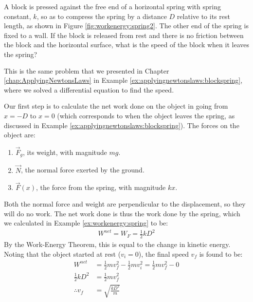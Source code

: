\begin{example}{A block is pressed against the free end of a horizontal spring with spring constant, $k$, so as to compress the spring by a distance $D$ relative to its rest length, as shown in Figure \ref{fig:workenergy:spring2}. The other end of the spring is fixed to a wall. 
If the block is released from rest and there is no friction between the block and the horizontal surface, what is the speed of the block when it leaves the spring?
}

This is the same problem that we presented in Chapter \ref{chap:ApplyingNewtonsLaws} in Example \ref{ex:applyingnewtonslaws:blockspring}, where we solved a differential equation to find the speed. 

Our first step is to calculate the net work done on the object in going from $x=-D$ to $x=0$ (which corresponds to when the object leaves the spring, as discussed in Example \ref{ex:applyingnewtonslaws:blockspring}). The forces on the object are:
\begin{enumerate}
\item $\vec F_g$, its weight, with magnitude $mg$.
\item $\vec N$, the normal force exerted by the ground.
\item $\vec F(x)$, the force from the spring, with magnitude $kx$. 
\end{enumerate}
Both the normal force and weight are perpendicular to the displacement, so they will do no work. The net work done is thus the work done by the spring, which we calculated in Example \ref{ex:workenergy:spring} to be:
\begin{align*}
W^{net} = W_F = \frac{1}{2}kD^2
\end{align*}
By the Work-Energy Theorem, this is equal to the change in kinetic energy. Noting that the object started at rest ($v_i=0$), the final speed $v_f$ is found to be:
\begin{align*}
W^{net} &=  \frac{1}{2}mv_f^2 - \frac{1}{2}mv_i^2 =  \frac{1}{2}mv_f^2 - 0\\
\frac{1}{2}kD^2 &=\frac{1}{2}mv_f^2\\
\therefore v_f &=\sqrt{\frac{kD^2}{m}}
\end{align*}
\end{example}

